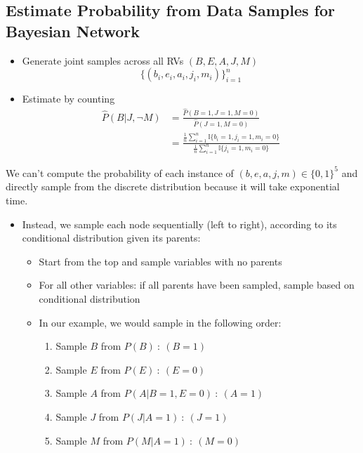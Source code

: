 \documentclass[10pt]{article}
\begin{document}
\subsection*{Estimate Probability from Data Samples for Bayesian Network}
\begin{itemize}
	\item Generate joint samples across all RVs $(B, E, A, J, M)$
	\[\{(b_i, e_i, a_i, j_i, m_i)\}_{i = 1}^n\]
    \item Estimate by counting
    \begin{align*}
        \hat{P} (B | J, \neg M) &= \frac{\hat{P} (B = 1, J = 1, M = 0)}{\hat{P}(J = 1, M = 0)} \\
        &= \frac{\frac{1}{n} \sum_{i = 1}^n \mathbb{I} \{b_i = 1, j_i = 1, m_i = 0\}}{\frac{1}{n} \sum_{i = 1}^n \mathbb{I} \{j_i = 1, m_i = 0\}}
    \end{align*}
\end{itemize}
We can't compute the probability of each instance of $(b, e, a, j, m) \in \{0, 1\}^5$ and directly sample from the discrete distribution because it will take exponential time.
\begin{itemize}
	\item Instead, we sample each node sequentially (left to right), according to its conditional distribution given its parents:
	\begin{itemize}
	    \item Start from the top and sample variables with no parents
	    \item For all other variables: if all parents have been sampled, sample based on conditional distribution
	    \item In our example, we would sample in the following order:
	    \begin{enumerate}
	        \item Sample $B$ from $P(B)\::\: (B = 1)$
	        \item Sample $E$ from $P(E)\::\: (E = 0)$
	        \item Sample $A$ from $P(A | B = 1, E = 0)\::\: (A = 1)$
	        \item Sample $J$ from $P(J | A = 1) \::\: (J = 1)$
	        \item Sample $M$ from $P(M | A = 1)\::\: (M = 0)$
        \end{enumerate}
    \end{itemize}
\end{itemize}
\end{document}
